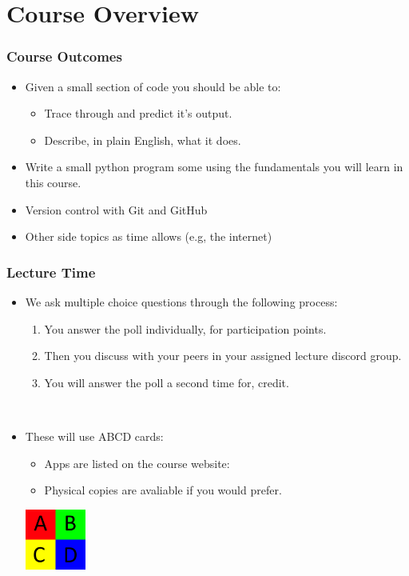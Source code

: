 \documentclass{beamer}
\begin{document}
\section{Course Overview}

\begin{frame}
  \frametitle{Course Outcomes}
  \begin{itemize}
    \item Given a small section of code you should be able to:
      \begin{itemize}
        \item Trace through and predict it's output.
        \item Describe, in plain English, what it does.
      \end{itemize}
    \item Write a small python program some using the fundamentals you will learn in this course.
    \item Version control with Git and GitHub
    \item Other side topics as time allows (e.g, the internet)
  \end{itemize}
\end{frame}

\begin{frame}
  \frametitle{Lecture Time}
  \begin{itemize}
    \item We ask multiple choice questions through the following process:
      \begin{enumerate}
        \item You answer the poll individually, for participation points.
        \item Then you discuss with your peers in your assigned lecture discord group.
        \item You will answer the poll a second time for, credit.
      \end{enumerate}
      \\ \vfill 
    \item These will use ABCD cards:\\
      \begin{minipage}{0.45\textwidth}
        \begin{itemize}
          \item Apps are listed on the course website: 
          \item Physical copies are avaliable if you would prefer.
        \end{itemize}
      \end{minipage}
      \begin{minipage}{0.45\textwidth} 
        \includegraphics[height=75px]{./imgs/abcd.png}
      \end{minipage}
  \end{itemize}
\end{frame}
\end{document}
